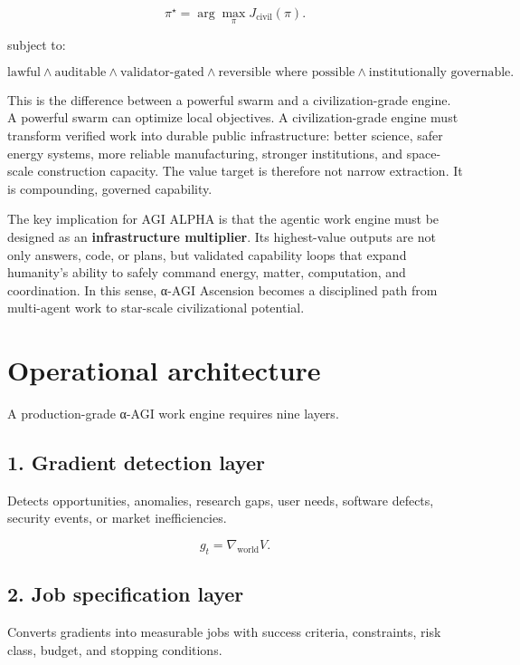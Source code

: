\documentclass[11pt]{article}
\begin{document}
\[
\pi^{\star}=\arg\max_{\pi}J_{\mathrm{civil}}(\pi).
\]

subject to:

\[
\text{lawful}\land\text{auditable}\land\text{validator-gated}\land\text{reversible where possible}\land\text{institutionally governable}.
\]

This is the difference between a powerful swarm and a civilization-grade
engine. A powerful swarm can optimize local objectives. A
civilization-grade engine must transform verified work into durable
public infrastructure: better science, safer energy systems, more
reliable manufacturing, stronger institutions, and space-scale
construction capacity. The value target is therefore not narrow
extraction. It is compounding, governed capability.

The key implication for AGI ALPHA is that the agentic work engine must
be designed as an \textbf{infrastructure multiplier}. Its highest-value
outputs are not only answers, code, or plans, but validated capability
loops that expand humanity's ability to safely command energy, matter,
computation, and coordination. In this sense, α-AGI Ascension becomes a
disciplined path from multi-agent work to star-scale civilizational
potential.

\section{Operational architecture}\label{operational-architecture}

A production-grade α-AGI work engine requires nine layers.

\subsection{1. Gradient detection layer}\label{gradient-detection-layer}

Detects opportunities, anomalies, research gaps, user needs, software
defects, security events, or market inefficiencies.

\[
g_t=\nabla_{\text{world}}V.
\]

\subsection{2. Job specification layer}\label{job-specification-layer}

Converts gradients into measurable jobs with success criteria,
constraints, risk class, budget, and stopping conditions.
\end{document}
